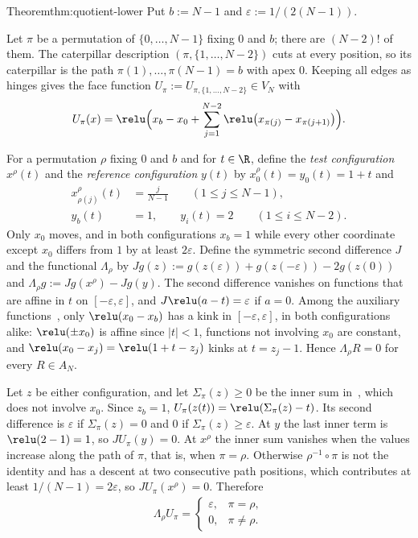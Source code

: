 \begin{Proof}{Theorem}{thm:quotient-lower}
Put $b:=N-1$ and $\varepsilon:=1/(2(N-1))$.

Let $\pi$ be a permutation of $\{0,\ldots,N-1\}$ fixing $0$ and $b$; there
are $(N-2)!$ of them. The caterpillar description $(\pi,\{1,\ldots,N-2\})$
cuts at every position, so its caterpillar is the path
$\pi(1),\ldots,\pi(N-1)=b$ with apex $0$. Keeping all edges as hinges gives
the face function $U_\pi:=U_{\pi,\{1,\ldots,N-2\}}\in V_N$ with
\begin{align}\label{eq:path-unit}
 U_\pi(x)=\relu\Bigl(x_b-x_0+\sum_{j=1}^{N-2}\relu\bigl(x_{\pi(j)}-x_{\pi(j+1)}\bigr)\Bigr).
\end{align}

For a permutation $\rho$ fixing $0$ and $b$ and for $t\in\R$, define the
\emph{test configuration} $x^\rho(t)$ and the \emph{reference
configuration} $y(t)$ by $x^\rho_0(t)=y_0(t)=1+t$ and
\begin{align}
 x^\rho_{\rho(j)}(t)&=\frac j{N-1}\qquad(1\leq j\leq N-1),\label{eq:test-configuration}\\
 y_b(t)&=1,\qquad y_i(t)=2\qquad(1\leq i\leq N-2).\label{eq:reference-configuration}
\end{align}
Only $x_0$ moves, and in both configurations $x_b=1$ while every other
coordinate except $x_0$ differs from $1$ by at least $2\varepsilon$. Define
the symmetric second difference $J$ and the functional $\Lambda_\rho$ by
$Jg(z):=g(z(\varepsilon))+g(z(-\varepsilon))-2g(z(0))$ and
$\Lambda_\rho g:=Jg(x^\rho)-Jg(y)$. The second difference vanishes on
functions that are affine in $t$ on $[-\varepsilon,\varepsilon]$, and
$J\relu(a-t)=\varepsilon$ if $a=0$. Among the auxiliary
functions~, only $\relu(x_0-x_b)$ has a kink in
$[-\varepsilon,\varepsilon]$, in both configurations alike: $\relu(\pm x_0)$
is affine since $|t|<1$, functions not involving $x_0$ are constant, and
$\relu(x_0-x_j)=\relu(1+t-z_j)$ kinks at $t=z_j-1$. Hence
$\Lambda_\rho R=0$ for every $R\in A_N$.

Let $z$ be either configuration, and let $\Sigma_\pi(z)\geq0$ be the inner
sum in~, which does not involve $x_0$. Since $z_b=1$,
$U_\pi(z(t))=\relu(\Sigma_\pi(z)-t)$. Its second difference is
$\varepsilon$ if $\Sigma_\pi(z)=0$ and $0$ if $\Sigma_\pi(z)\geq\varepsilon$.
At $y$ the last inner term is $\relu(2-1)=1$, so $JU_\pi(y)=0$. At $x^\rho$
the inner sum vanishes when the values increase along the path of $\pi$,
that is, when $\pi=\rho$. Otherwise $\rho^{-1}\circ\pi$ is not the identity
and has a descent at two consecutive path positions, which contributes at
least $1/(N-1)=2\varepsilon$, so $JU_\pi(x^\rho)=0$. Therefore
\begin{align}\label{eq:path-functional}
 \Lambda_\rho U_\pi=\begin{cases}\varepsilon,&\pi=\rho,\\0,&\pi\neq\rho.\end{cases}
\end{align}


\end{Proof}
